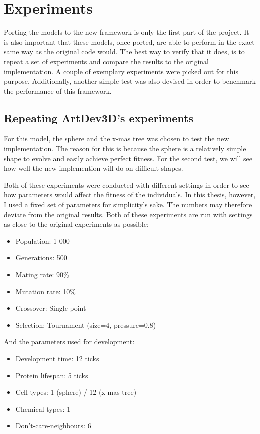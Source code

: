 \section{Experiments}
\label{sec:experiments}
Porting the models to the new framework is only the first part of the project. It is also important that these models, once ported, are able to perform in the exact same way as the original code would. The best way to verify that it does, is to repeat a set of experiments and compare the results to the original implementation. A couple of exemplary experiments were picked out for this purpose. Additionally, another simple test was also devised in order to benchmark the performance of this framework.

\subsection{Repeating ArtDev3D's experiments}
For this model, the sphere and the x-mas tree was chosen to test the new implementation. The reason for this is because the sphere is a relatively simple shape to evolve and easily achieve perfect fitness. For the second test, we will see how well the new implemention will do on difficult shapes.

Both of these experiments were conducted with different settings in order to see how parameters would affect the fitness of the individuals. In this thesis, however, I used a fixed set of parameters for simplicity's sake. The numbers may therefore deviate from the original results. Both of these experiments are run with settings as close to the original experiments as possible:

\begin{itemize}
	\itemsep=-2pt
	\item Population: 1 000
	\item Generations: 500
	\item Mating rate: 90\%
	\item Mutation rate: 10\%
	\item Crossover: Single point
	\item Selection: Tournament (size=4, pressure=0.8)
\end{itemize}

And the parameters used for development:

\begin{itemize}
	\itemsep=-2pt
	\item Development time: 12 ticks
	\item Protein lifespan: 5 ticks
	\item Cell types: 1 (sphere) / 12 (x-mas tree)
	\item Chemical types: 1
	\item Don't-care-neighbours: 6
\end{itemize}

